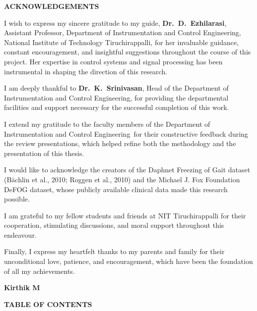 \documentclass[12pt,a4paper,oneside]{report}
\numberwithin{equation}{chapter}
\numberwithin{figure}{chapter}
\numberwithin{table}{chapter}
\newcommand{\StudentName}{Kirthik M}
\newcommand{\GuideName}{Dr.\ D.\ Ezhilarasi}
\newcommand{\HoDName}{Dr.\ K.\ Srinivasan}
\newcommand{\DeptName}{Instrumentation and Control Engineering}
\begin{document}
\newpage



\begin{center}
{\fontsize{14}{16}\selectfont\bfseries ACKNOWLEDGEMENTS}
\end{center}

\vspace{0.5cm}

I wish to express my sincere gratitude to my guide, \textbf{\GuideName}, Assistant Professor, Department of \DeptName, National Institute of Technology Tiruchirappalli, for her invaluable guidance, constant encouragement, and insightful suggestions throughout the course of this project. Her expertise in control systems and signal processing has been instrumental in shaping the direction of this research.

I am deeply thankful to \textbf{\HoDName}, Head of the Department of \DeptName, for providing the departmental facilities and support necessary for the successful completion of this work.

I extend my gratitude to the faculty members of the Department of \DeptName\ for their constructive feedback during the review presentations, which helped refine both the methodology and the presentation of this thesis.

I would like to acknowledge the creators of the Daphnet Freezing of Gait dataset (B\"{a}chlin et al., 2010; Roggen et al., 2010) and the Michael J. Fox Foundation DeFOG dataset, whose publicly available clinical data made this research possible.

I am grateful to my fellow students and friends at NIT Tiruchirappalli for their cooperation, stimulating discussions, and moral support throughout this endeavour.

Finally, I express my heartfelt thanks to my parents and family for their unconditional love, patience, and encouragement, which have been the foundation of all my achievements.

\vspace{1.5cm}

\hfill \textbf{\StudentName}

\newpage


\newpage
\vspace*{1in}
\begin{center}
\hspace*{-0.25in}
\begin{minipage}{\dimexpr\textwidth+0.5in\relax}
\centering
{\fontsize{14}{16}\selectfont\bfseries TABLE OF CONTENTS}
\end{minipage}
\end{center}
\vspace{1cm}
\makeatletter
{}
\makeatother
\newpage
\end{document}
